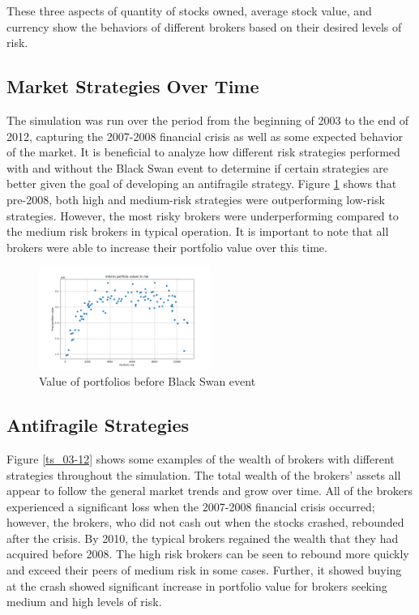 \documentclass[letterpaper, 11 pt, proceedings]{IEEEtran}
\begin{document}
	These three aspects of quantity of stocks owned, average stock value, and currency show the behaviors of different brokers based on their desired levels of risk.

	\subsection{Market Strategies Over Time}\label{subsec:results_midpoint}
	The simulation was run over the period from the beginning of 2003 to the end of 2012, capturing the 2007-2008 financial crisis as well as some expected behavior of the market. It is beneficial to analyze how different risk strategies performed with and without the Black Swan event to determine if certain strategies are better given the goal of developing an antifragile strategy. Figure \ref{interimRV} shows that pre-2008, both high and medium-risk strategies were outperforming low-risk strategies. However, the most risky brokers were underperforming compared to the medium risk brokers in typical operation. It is important to note that all brokers were able to increase their portfolio value over this time.

	\begin{figure}[h]
		\centering
		\includegraphics[width=0.5\textwidth]{interimRiskToValue.png}
		\caption{Value of portfolios before Black Swan event}
		\label{interimRV}
	\end{figure}
	\FloatBarrier

	\subsection{Antifragile Strategies}\label{subsec:results_end}	
	
	Figure \ref{ts_03-12} shows some examples of the wealth of brokers with different strategies throughout the simulation. The total wealth of the brokers' assets all appear to follow the general market trends and grow over time. All of the brokers experienced a significant loss when the 2007-2008 financial crisis occurred; however, the brokers, who did not cash out when the stocks crashed, rebounded after the crisis. By 2010, the typical brokers regained the wealth that they had acquired before 2008. The high risk brokers can be seen to rebound more quickly and exceed their peers of medium risk in some cases. Further, it showed buying at the crash showed significant increase in portfolio value for brokers seeking medium and high levels of risk.
	
\end{document}

